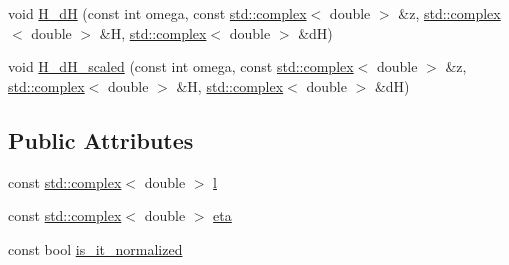 \begin{DoxyCompactItemize}
\item 
void \hyperlink{classCoulomb__wave__functions_aed77d82a52638ff69f9526ad7504795f}{H\-\_\-d\-H} (const int omega, const \hyperlink{Constants_8h_a1c1b16cc02d518bbe753449171ab7033}{std\-::complex}$<$ double $>$ \&z, \hyperlink{Constants_8h_a1c1b16cc02d518bbe753449171ab7033}{std\-::complex}$<$ double $>$ \&H, \hyperlink{Constants_8h_a1c1b16cc02d518bbe753449171ab7033}{std\-::complex}$<$ double $>$ \&d\-H)
\item 
void \hyperlink{classCoulomb__wave__functions_a4820d8d44ee5c5e9193c8950e98935c2}{H\-\_\-d\-H\-\_\-scaled} (const int omega, const \hyperlink{Constants_8h_a1c1b16cc02d518bbe753449171ab7033}{std\-::complex}$<$ double $>$ \&z, \hyperlink{Constants_8h_a1c1b16cc02d518bbe753449171ab7033}{std\-::complex}$<$ double $>$ \&H, \hyperlink{Constants_8h_a1c1b16cc02d518bbe753449171ab7033}{std\-::complex}$<$ double $>$ \&d\-H)
\end{DoxyCompactItemize}
\subsection*{Public Attributes}
\begin{DoxyCompactItemize}
\item 
const \hyperlink{Constants_8h_a1c1b16cc02d518bbe753449171ab7033}{std\-::complex}$<$ double $>$ \hyperlink{classCoulomb__wave__functions_a184f08ca7adeb5d334b72dc354777a64}{l}
\item 
const \hyperlink{Constants_8h_a1c1b16cc02d518bbe753449171ab7033}{std\-::complex}$<$ double $>$ \hyperlink{classCoulomb__wave__functions_a944d6723016c4c50ad7a9b55d62a0131}{eta}
\item 
const bool \hyperlink{classCoulomb__wave__functions_a11b791087220f0194b2750d36946392e}{is\-\_\-it\-\_\-normalized}
\end{DoxyCompactItemize}


